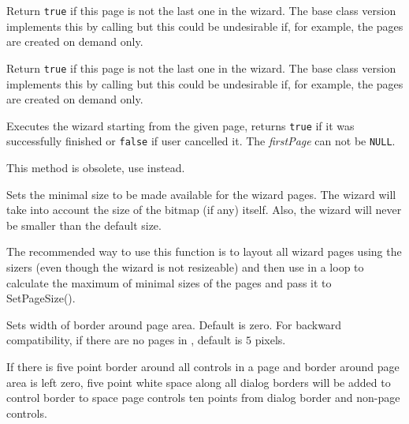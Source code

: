 
Return {\tt true} if this page is not the last one in the wizard. The base
class version implements this by calling 
 but this could be undesirable if,
for example, the pages are created on demand only.




\label{wxwizardhasprevpage}


Return {\tt true} if this page is not the last one in the wizard. The base
class version implements this by calling 
 but this could be undesirable if,
for example, the pages are created on demand only.




\label{wxwizardrunwizard}


Executes the wizard starting from the given page, returns {\tt true} if it was
successfully finished or {\tt false} if user cancelled it. The {\it firstPage} 
can not be {\tt NULL}.


\label{wxwizardsetpagesize}


This method is obsolete, use
 instead.

Sets the minimal size to be made available for the wizard pages. The wizard
will take into account the size of the bitmap (if any) itself. Also, the
wizard will never be smaller than the default size.

The recommended way to use this function is to layout all wizard pages using
the sizers (even though the wizard is not resizeable) and then use 
 in a loop to calculate the maximum
of minimal sizes of the pages and pass it to SetPageSize().


\label{wxwizardsetborder}


Sets width of border around page area. Default is zero. For backward
compatibility, if there are no pages in
, default is $5$ pixels.

If there is five point border around all controls in a page and border around
page area is left zero, five point white space along all dialog borders
will be added to control border to space page controls ten points from dialog
border and non-page controls.

